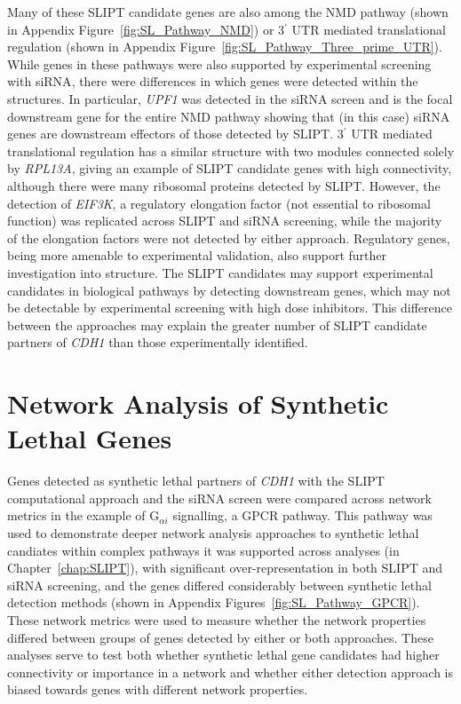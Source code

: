 Many of these \gls{SLIPT} candidate genes are also among the \gls{NMD} \gls{pathway} (shown in Appendix Figure~\ref{fig:SL_Pathway_NMD}) or 3$^\prime$ \gls{UTR} mediated translational regulation (shown in Appendix Figure~\ref{fig:SL_Pathway_Three_prime_UTR}). While genes in these \glspl{pathway} were also supported by experimental screening with \gls{siRNA}, there were differences in which genes were detected within the  structures. In particular, \textit{UPF1} was detected in the \gls{siRNA} screen and is the focal downstream gene for the entire \gls{NMD} \gls{pathway} showing that (in this case) \gls{siRNA} genes are downstream effectors of those detected by \gls{SLIPT}.  3$^\prime$ \gls{UTR} mediated translational regulation has a similar structure with two modules connected solely by \textit{RPL13A}, giving an example of \gls{SLIPT} candidate genes with high connectivity, although there were many ribosomal proteins detected by \gls{SLIPT}. However, the detection of \textit{EIF3K}, a regulatory elongation factor (not \gls{essential} to ribosomal function) was replicated across \gls{SLIPT} and \gls{siRNA} screening, while the majority of the elongation factors were not detected by either approach. Regulatory genes, being more amenable to experimental validation, also support further investigation into  structure. The \gls{SLIPT} candidates may support experimental candidates in biological \glspl{pathway} by detecting downstream genes, which may not be detectable by experimental screening with high dose inhibitors. This difference between the approaches may explain the greater number of \gls{SLIPT} candidate partners of \textit{CDH1} than those experimentally identified.


\FloatBarrier

\section{Network Analysis of Synthetic Lethal Genes}   \label{chapt4:Network_Test}


Genes detected as \gls{synthetic lethal} partners of \textit{CDH1} with the \gls{SLIPT} computational approach and the \gls{siRNA} screen \citep{Telford2015} were compared across network metrics in the example of G$_{\alpha i}$ signalling, a \gls{GPCR} \gls{pathway}. This \gls{pathway} was used to demonstrate deeper network analysis approaches to \gls{synthetic lethal} candiates within complex \glspl{pathway} it was supported across analyses (in Chapter~\ref{chap:SLIPT}), with significant over-representation in both \gls{SLIPT} and \gls{siRNA} screening, and the genes differed considerably between \gls{synthetic lethal} detection methods (shown in Appendix Figures~\ref{fig:SL_Pathway_GPCR}).  These network metrics were used to measure whether the network properties differed between groups of genes detected by either or both approaches. These analyses serve to test both whether \gls{synthetic lethal} gene candidates had higher connectivity or importance in a network and whether either detection approach is biased towards genes with different network properties.  

